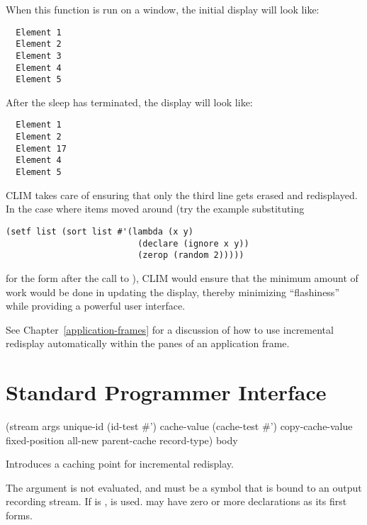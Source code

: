 When this function is run on a window, the initial display will look like:

\begin{verbatim}
  Element 1
  Element 2
  Element 3
  Element 4
  Element 5
\end{verbatim}

After the sleep has terminated, the display will look like:

\begin{verbatim}
  Element 1
  Element 2
  Element 17
  Element 4
  Element 5
\end{verbatim}

CLIM takes care of ensuring that only the third line gets erased and
redisplayed.  In the case where items moved around (try the example substituting

\begin{verbatim}
(setf list (sort list #'(lambda (x y)
                          (declare (ignore x y))
                          (zerop (random 2))))) 
\end{verbatim}

for the form after the call to ), CLIM would ensure that the minimum
amount of work would be done in updating the display, thereby minimizing
``flashiness'' while providing a powerful user interface.

See Chapter~\ref{application-frames} for a discussion of how to use incremental
redisplay automatically within the panes of an application frame.


\section {Standard Programmer Interface}

 {(stream
                              \rest args
                              \key unique-id (id-test \#')
                                   cache-value (cache-test \#')
                                   copy-cache-value fixed-position 
                                   all-new parent-cache
                                   record-type)
                             \body body}

Introduces a caching point for incremental redisplay.  

The  argument is not evaluated, and must be a symbol that is bound to
an output recording stream.  If  is ,  is
used.   may have zero or more declarations as its first forms.

